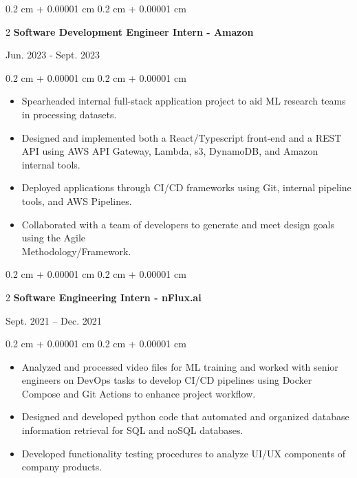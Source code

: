 \documentclass[10pt, letterpaper]{article}
\newenvironment{highlightsforbulletentries}{
    \begin{itemize}[
        topsep=0.10 cm,
        parsep=0.10 cm,
        partopsep=0pt,
        itemsep=0pt,
        leftmargin=10pt
    ]
}{
    \end{itemize}
} %
\newenvironment{onecolentry}{
    \begin{adjustwidth}{
        0.2 cm + 0.00001 cm
    }{
        0.2 cm + 0.00001 cm
    }
}{
    \end{adjustwidth}
} %
\newenvironment{twocolentry}[2][]{
    \onecolentry
    \def\secondColumn{#2}
    \setcolumnwidth{\fill, 4.5 cm}
    \begin{paracol}{2}
}{
    \switchcolumn \raggedleft \secondColumn
    \end{paracol}
    \endonecolentry
} %
\begin{document}
        \begin{twocolentry}{
            Jun. 2023 - Sept. 2023
        }{
            \textbf{Software Development Engineer Intern - Amazon}
        }
        \end{twocolentry}
        \vspace{0.1 cm}
        \begin{onecolentry}
            \begin{highlightsforbulletentries}
                \item Spearheaded internal full-stack application project to aid ML research teams in processing
                datasets.
                \item Designed and implemented both a React/Typescript front-end and a REST API using AWS API Gateway,
                Lambda, s3, DynamoDB, and Amazon internal tools.
                \item Deployed applications through CI/CD frameworks using Git, internal pipeline tools, and AWS
                Pipelines.
                \item Collaborated with a team of developers to generate and meet design goals using the Agile\\
                Methodology/Framework.
            \end{highlightsforbulletentries}
        \end{onecolentry}

        \vspace{0.2 cm}

        \begin{twocolentry}{
            Sept. 2021 – Dec. 2021
        }{
            \textbf{Software Engineering Intern - nFlux.ai}
        }
        \end{twocolentry}
        \vspace{0.1 cm}
        \begin{onecolentry}
            \begin{highlightsforbulletentries}
                \item Analyzed and processed video files for ML training and worked with senior engineers on DevOps
                tasks to develop CI/CD pipelines using Docker Compose and Git Actions to enhance project workflow.
                \item Designed and developed python code that automated and organized database information retrieval
                for SQL and noSQL databases.
                \item Developed functionality testing procedures to analyze UI/UX components of company products.
            \end{highlightsforbulletentries}
        \end{onecolentry}
\end{document}
